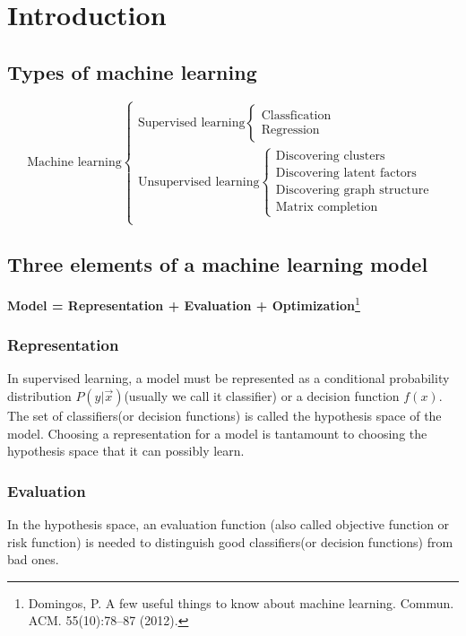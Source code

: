 \chapter{Introduction}

\section{Types of machine learning}
\begin{equation}\nonumber
\text{Machine learning}\begin{cases}
\text{Supervised learning} \begin{cases} \text{Classfication} \\ \text{Regression} \end{cases}\\
\text{Unsupervised learning} \begin{cases} \text{Discovering clusters} \\ \text{Discovering latent factors} \\ \text{Discovering graph structure} \\ \text{Matrix completion} \end{cases}\\
\end{cases}
\end{equation}


\section{Three elements of a machine learning model}

\textbf{Model = Representation + Evaluation + Optimization}\footnote{Domingos, P. A few useful things to know about machine learning. Commun. ACM. 55(10):78–87 (2012).}


\subsection{Representation}
In supervised learning, a model must be represented as a conditional probability distribution $P(y|\vec{x})$(usually we call it classifier) or a decision function $f(x)$. The set of classifiers(or decision functions) is called the hypothesis space of the model. Choosing a representation for a model is tantamount to choosing the hypothesis space that it can possibly learn. 


\subsection{Evaluation}
In the hypothesis space, an evaluation function (also called objective function or risk function) is needed to distinguish good classifiers(or decision functions) from bad ones.


